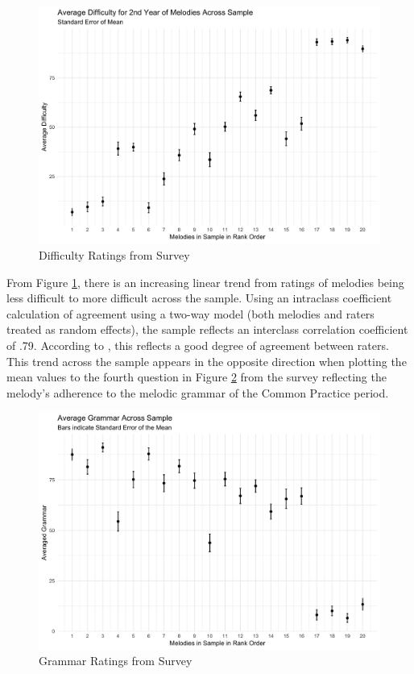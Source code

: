 \documentclass[12pt,]{book}
\begin{document}
\begin{figure}

{\centering \includegraphics[width=1\linewidth]{img/difficulty_plot} 

}

\caption{Difficulty Ratings from Survey}\label{fig:diffplot}
\end{figure}

From Figure \ref{fig:diffplot}, there is an increasing linear trend from ratings of melodies being less difficult to more difficult across the sample.
Using an intraclass coefficient calculation of agreement using a two-way model (both melodies and raters treated as random effects), the sample reflects an interclass correlation coefficient of .79.
According to \citet{kooGuidelineSelectingReporting2016}, this reflects a good degree of agreement between raters.
This trend across the sample appears in the opposite direction when plotting the mean values to the fourth question in Figure \ref{fig:grammarplot} from the survey reflecting the melody's adherence to the melodic grammar of the Common Practice period.

\begin{figure}

{\centering \includegraphics[width=1\linewidth]{img/grammar_plot} 

}

\caption{Grammar Ratings from Survey}\label{fig:grammarplot}
\end{figure}
\end{document}
